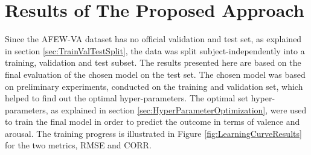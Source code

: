 \section{Results of The Proposed Approach} \label{sec:ResultsProposedApproach}
Since the AFEW-VA dataset has no official validation and test set, as explained in section \ref{sec:TrainValTestSplit}, the data was split subject-independently into a training, validation and test subset. The results presented here are based on the final evaluation of the chosen model on the test set. The chosen model was based on preliminary experiments, conducted on the training and validation set, which helped to find out the optimal hyper-parameters.
\newline\newline
The optimal set hyper-parameters, as explained in section \ref{sec:HyperParameterOptimization}, were used to train the final model in order to predict the outcome in terms of valence and arousal. The training progress is illustrated in Figure \ref{fig:LearningCurveResults} for the two metrics, RMSE and CORR.
\newline 

